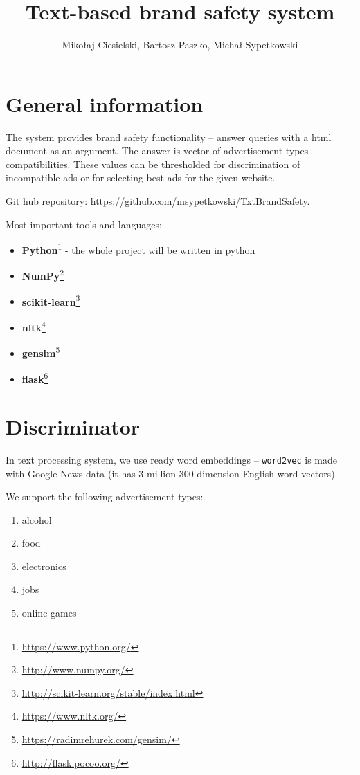 \documentclass[a4paper]{article}
\begin{document}
\title{Text-based brand safety system}

\author{Mikołaj Ciesielski, Bartosz Paszko, Michał Sypetkowski}
\maketitle

\section{General information}

The system provides brand safety functionality --
answer queries with a html document as an argument.
The answer is vector of advertisement types compatibilities.
These values can be thresholded for discrimination of incompatible
ads or for selecting best ads for the given website.


Git hub repository: \url{https://github.com/msypetkowski/TxtBrandSafety}.

Most important tools and languages:
\begin{itemize}
    \item \textbf{Python}\footnote{\url{https://www.python.org/}}
        - the whole project will be written in python
    \item \textbf{NumPy}\footnote{\url{http://www.numpy.org/}}
    \item \textbf{scikit-learn}\footnote{\url{http://scikit-learn.org/stable/index.html}}
    \item \textbf{nltk}\footnote{\url{https://www.nltk.org/}}
    \item \textbf{gensim}\footnote{\url{https://radimrehurek.com/gensim/}}
    \item \textbf{flask}\footnote{\url{http://flask.pocoo.org/}}
\end{itemize}


\section{Discriminator}
In text processing system, we use ready word embeddings --
\texttt{word2vec} is made with Google News data (it has 3 million 300-dimension English word vectors).


We support the following advertisement types:
\begin{enumerate}
    \item alcohol
    \item food
    \item electronics
    \item jobs
    \item online games
\end{enumerate}
\end{document}
